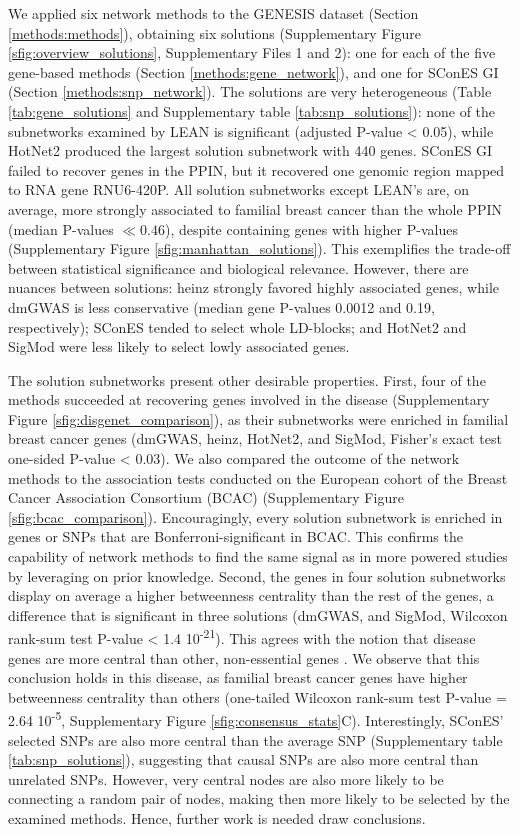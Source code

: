 \documentclass[twocolumn, 10pt]{article}
\begin{document}
We applied six network methods to the GENESIS dataset (Section \ref{methods:methods}), obtaining six solutions (Supplementary Figure \ref{sfig:overview_solutions}, Supplementary Files 1 and 2): one for each of the five gene-based methods (Section \ref{methods:gene_network}), and one for SConES GI (Section \ref{methods:snp_network}). The solutions are very heterogeneous (Table \ref{tab:gene_solutions} and Supplementary table \ref{tab:snp_solutions}): none of the subnetworks examined by LEAN is significant (adjusted P-value < 0.05), while HotNet2 produced the largest solution subnetwork with 440 genes. SConES GI failed to recover genes in the PPIN, but it recovered one genomic region mapped to RNA gene RNU6-420P. All solution subnetworks except LEAN's are, on average, more strongly associated to familial breast cancer than the whole PPIN (median P-values $\ll 0.46$), despite containing genes with higher P-values (Supplementary Figure \ref{sfig:manhattan_solutions}). This exemplifies the trade-off between statistical significance and biological relevance. However, there are nuances between solutions: heinz strongly favored highly associated genes, while dmGWAS is less conservative (median gene P-values 0.0012 and 0.19, respectively); SConES tended to select whole LD-blocks; and HotNet2 and SigMod were less likely to select lowly associated genes. 

The solution subnetworks present other desirable properties. First, four of the methods succeeded at recovering genes involved in the disease (Supplementary Figure \ref{sfig:disgenet_comparison}), as their subnetworks were enriched in familial breast cancer genes (dmGWAS, heinz, HotNet2, and SigMod, Fisher's exact test one-sided P-value < 0.03). We also compared the outcome of the network methods to the association tests conducted on the European cohort of the Breast Cancer Association Consortium (BCAC) \cite{michailidou_genome-wide_2015} (Supplementary Figure \ref{sfig:bcac_comparison}). Encouragingly, every solution subnetwork is enriched in genes or SNPs that are Bonferroni-significant in BCAC. This confirms the capability of network methods to find the same signal as in more powered studies by leveraging on prior knowledge. Second, the genes in four solution subnetworks display on average a higher betweenness centrality than the rest of the genes, a difference that is significant in three solutions (dmGWAS, and SigMod, Wilcoxon rank-sum test P-value < 1.4 \texttimes{} 10\textsuperscript{-21}). This agrees with the notion that disease genes are more central than other, non-essential genes \cite{pinero_uncovering_2016}. We observe that this conclusion holds in this disease, as familial breast cancer genes have higher betweenness centrality than others (one-tailed Wilcoxon rank-sum test P-value = 2.64 \texttimes{} 10\textsuperscript{-5}, Supplementary Figure \ref{sfig:consensus_stats}C). Interestingly, SConES' selected SNPs are also more central than the average SNP (Supplementary table \ref{tab:snp_solutions}), suggesting that causal SNPs are also more central than unrelated SNPs. However, very central nodes are also more likely to be connecting a random pair of nodes, making then more likely to be selected by the examined methods. Hence, further work is needed draw conclusions.
\end{document}

